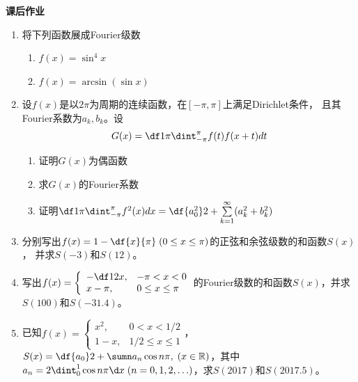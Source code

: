 \begin{ext}
	{\bf 课后作业}
	\begin{enumerate}
	  \item 将下列函数展成Fourier级数
		\begin{enumerate}[(1)]
		  \item $f(x)=\sin^4x$
		  \item $f(x)=\arcsin(\sin x)$
		\end{enumerate}
	  \item 设$f(x)$是以$2\pi$为周期的连续函数，在$[-\pi,\pi]$上满足Dirichlet条件，
		且其Fourier系数为$a_k,b_k$。设
		$$G(x)=\df1{\pi}\dint_{-\pi}^{\pi}f(t)f(x+t)dt$$
		\begin{enumerate}[(1)]
		  \item 证明$G(x)$为偶函数
		  \item 求$G(x)$的Fourier系数
		  \item 证明$\df1{\pi}\dint_{-\pi}^{\pi}f^2(x)dx=\df{a_0^2}2+
		  \sum\limits_{k=1}^{\infty}(a_k^2+b_k^2)$
		\end{enumerate}
	  \item 分别写出$f(x)=1-\df{x}{\pi}\;(0\leq x\leq\pi)$的正弦和余弦级数的和函数$S(x)$，
		并求$S(-3)$和$S(12)$。
	  \item 写出$f(x)=\left\{\begin{array}{ll}
			-\df12x,&-\pi<x<0\\ x-\pi,&0\leq x\leq \pi
		\end{array}\right.$的Fourier级数的和函数$S(x)$，并求$S(100)$和$S(-31.4)$。
	  \item 已知$f(x)=\left\{\begin{array}{ll}
			x^2,&0<x<1/2\\ 1-x,&1/2\leq x\leq 1
		\end{array}\right.$，
		$S(x)=\df{a_0}2+\sumn a_n\cos n\pi,\;(x\in\mathbb{R})$，其中
		$a_n=2\dint_0^1\cos n\pi\d x\;(n=0,1,2,\ldots)$，求$S(2017)$和$S(2017.5)$。
	\end{enumerate}
\end{ext}